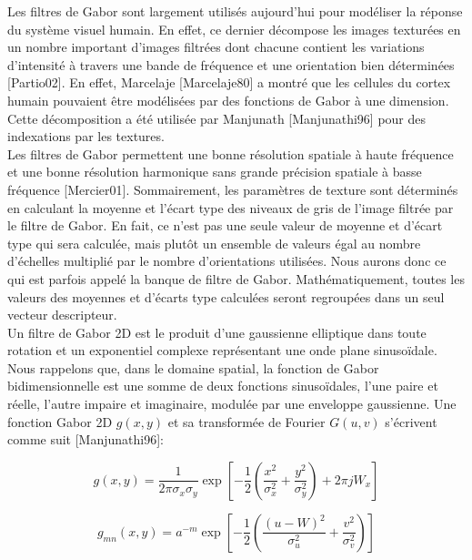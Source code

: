 Les filtres de Gabor sont largement utilisés aujourd’hui pour modéliser la réponse du système visuel humain. En effet, ce dernier décompose les images texturées en un nombre important d'images filtrées dont chacune contient les variations d'intensité à travers une bande de fréquence et une orientation bien déterminées [Partio02]. En effet, Marcelaje [Marcelaje80] a montré que les cellules du cortex humain pouvaient être modélisées par des fonctions de Gabor à une dimension. Cette décomposition a été utilisée par Manjunath [Manjunathi96] pour des indexations par les textures.\\

Les filtres de Gabor permettent une bonne résolution spatiale à haute fréquence et une bonne résolution harmonique sans grande précision spatiale à basse fréquence [Mercier01]. Sommairement, les paramètres de texture sont déterminés en calculant la moyenne et l’écart type des niveaux de gris de l’image filtrée par le filtre de Gabor. En fait, ce n’est pas une seule valeur de moyenne et d’écart type qui sera calculée, mais plutôt un ensemble de valeurs égal au nombre d’échelles multiplié par le nombre d’orientations utilisées. Nous aurons donc ce qui est parfois appelé la banque de filtre de Gabor. Mathématiquement, toutes les valeurs des moyennes et d’écarts type calculées seront regroupées dans un seul vecteur descripteur. \\

Un filtre de Gabor 2D est le produit d'une gaussienne elliptique dans toute rotation et un exponentiel complexe représentant une onde plane sinusoïdale. Nous rappelons que, dans le domaine spatial, la fonction de Gabor bidimensionnelle est une somme de deux fonctions sinusoïdales, l'une paire et réelle, l'autre impaire et imaginaire, modulée par une enveloppe gaussienne. Une fonction Gabor 2D $g(x, y)$ et sa transformée de Fourier $G(u, v)$ s'écrivent comme suit [Manjunathi96]:



\begin{equation}
	g(x, y) = \frac{1}{2\pi \sigma_x \sigma_y} \exp\left[-\frac{1}{2} (\frac{x^2}{\sigma_x^2} + \frac{y^2}{\sigma_y^2}) + 2\pi j W_x\right]
\end{equation}

\begin{equation}
	g_{mn}(x, y) = a^{-m} \exp\left[-\frac{1}{2} (\frac{(u-W)^2}{\sigma_u^2} + \frac{v^2}{\sigma_v^2})\right] 
\end{equation}


